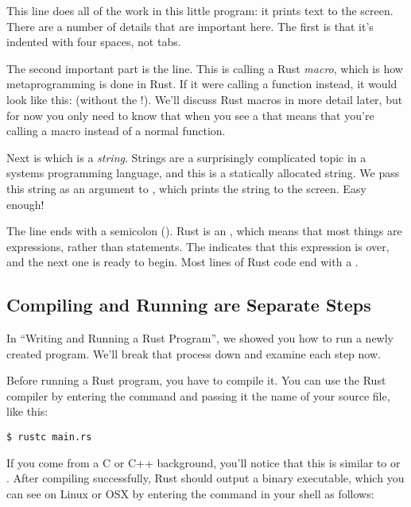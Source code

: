 This line does all of the work in this little program: it prints text to the screen. There are a number of details that are important 
here. The first is that it's indented with four spaces, not tabs.

\blank

The second important part is the  line. This is calling a Rust \emph{macro}, which is how metaprogramming is done 
in Rust. If it were calling a function instead, it would look like this:  (without the !). We'll discuss Rust macros 
in more detail later, but for now you only need to know that when you see a \code{!} that means that you're calling a macro 
instead of a normal function.

\blank

Next is  which is a \emph{string}. Strings are a surprisingly complicated topic in a systems programming 
language, and this is a statically allocated string. We pass this string as an argument to , which prints the 
string to the screen. Easy enough!

\blank

The line ends with a semicolon (\code{;}). Rust is an , which means that most things are 
expressions, rather than statements. The \code{;} indicates that this expression is over, and the next one is ready 
to begin. Most lines of Rust code end with a \code{;}.

\subsection*{Compiling and Running are Separate Steps}

In \enquote{Writing and Running a Rust Program}, we showed you how to run a newly created program. We'll break that process 
down and examine each step now.

\blank

Before running a Rust program, you have to compile it. You can use the Rust compiler by entering the 
 command and passing it the name of your source file, like this:

\begin{verbatim}
$ rustc main.rs
\end{verbatim}

If you come from a C or C++ background, you'll notice that this is similar to  or . After 
compiling successfully, Rust should output a binary executable, which you can see on Linux or OSX by entering the 
 command in your shell as follows:

